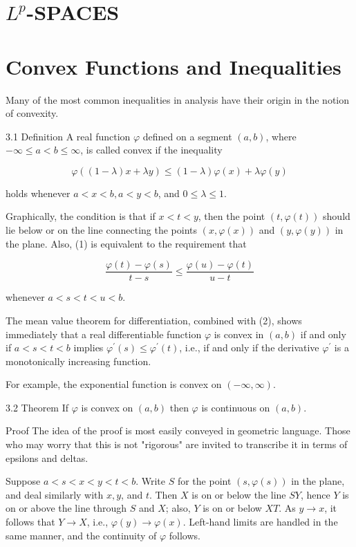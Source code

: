 \documentclass[10pt]{article}
\begin{document}
\section{$L^{p}$-SPACES}
\section{Convex Functions and Inequalities}
Many of the most common inequalities in analysis have their origin in the notion of convexity.

3.1 Definition A real function $\varphi$ defined on a segment $(a, b)$, where $-\infty \leq a<b \leq \infty$, is called convex if the inequality

$$
\varphi((1-\lambda) x+\lambda y) \leq(1-\lambda) \varphi(x)+\lambda \varphi(y)
$$

holds whenever $a<x<b, a<y<b$, and $0 \leq \lambda \leq 1$.

Graphically, the condition is that if $x<t<y$, then the point $(t, \varphi(t))$ should lie below or on the line connecting the points $(x, \varphi(x))$ and $(y, \varphi(y))$ in the plane. Also, (1) is equivalent to the requirement that

$$
\frac{\varphi(t)-\varphi(s)}{t-s} \leq \frac{\varphi(u)-\varphi(t)}{u-t}
$$

whenever $a<s<t<u<b$.

The mean value theorem for differentiation, combined with (2), shows immediately that a real differentiable function $\varphi$ is convex in $(a, b)$ if and only if $a<s<t<b$ implies $\varphi^{\prime}(s) \leq \varphi^{\prime}(t)$, i.e., if and only if the derivative $\varphi^{\prime}$ is a monotonically increasing function.

For example, the exponential function is convex on $(-\infty, \infty)$.

3.2 Theorem If $\varphi$ is convex on $(a, b)$ then $\varphi$ is continuous on $(a, b)$.

Proof The idea of the proof is most easily conveyed in geometric language. Those who may worry that this is not "rigorous" are invited to transcribe it in terms of epsilons and deltas.

Suppose $a<s<x<y<t<b$. Write $S$ for the point $(s, \varphi(s))$ in the plane, and deal similarly with $x, y$, and $t$. Then $X$ is on or below the line $S Y$, hence $Y$ is on or above the line through $S$ and $X$; also, $Y$ is on or below $X T$. As $y \rightarrow x$, it follows that $Y \rightarrow X$, i.e., $\varphi(y) \rightarrow \varphi(x)$. Left-hand limits are handled in the same manner, and the continuity of $\varphi$ follows.
\end{document}
